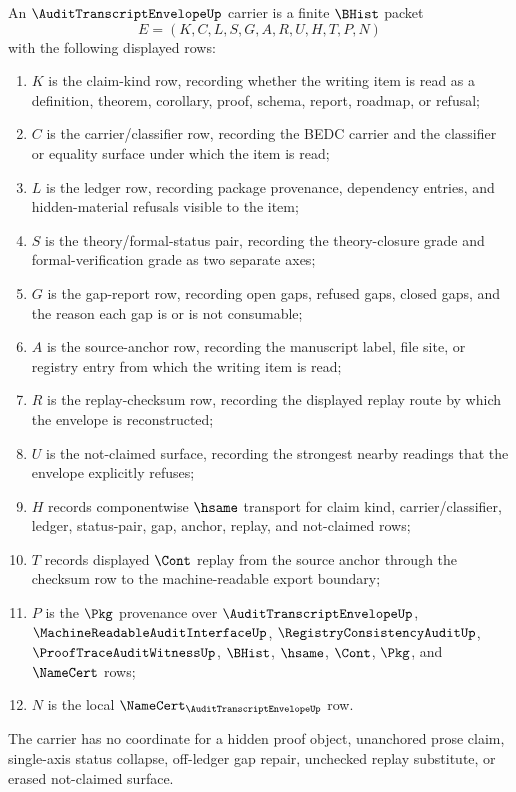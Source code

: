 \begin{definition}
\label{def:audit-transcript-envelope-carrier}
An $\AuditTranscriptEnvelopeUp$ carrier is a finite $\BHist$ packet
$$
E=(K,C,L,S,G,A,R,U,H,T,P,N)
$$
with the following displayed rows:
\begin{enumerate}
\item $K$ is the claim-kind row, recording whether the writing item is read as a definition, theorem, corollary, proof, schema, report, roadmap, or refusal;
\item $C$ is the carrier/classifier row, recording the BEDC carrier and the classifier or equality surface under which the item is read;
\item $L$ is the ledger row, recording package provenance, dependency entries, and hidden-material refusals visible to the item;
\item $S$ is the theory/formal-status pair, recording the theory-closure grade and formal-verification grade as two separate axes;
\item $G$ is the gap-report row, recording open gaps, refused gaps, closed gaps, and the reason each gap is or is not consumable;
\item $A$ is the source-anchor row, recording the manuscript label, file site, or registry entry from which the writing item is read;
\item $R$ is the replay-checksum row, recording the displayed replay route by which the envelope is reconstructed;
\item $U$ is the not-claimed surface, recording the strongest nearby readings that the envelope explicitly refuses;
\item $H$ records componentwise $\hsame$ transport for claim kind, carrier/classifier, ledger, status-pair, gap, anchor, replay, and not-claimed rows;
\item $T$ records displayed $\Cont$ replay from the source anchor through the checksum row to the machine-readable export boundary;
\item $P$ is the $\Pkg$ provenance over $\AuditTranscriptEnvelopeUp$, $\MachineReadableAuditInterfaceUp$, $\RegistryConsistencyAuditUp$, $\ProofTraceAuditWitnessUp$, $\BHist$, $\hsame$, $\Cont$, $\Pkg$, and $\NameCert$ rows;
\item $N$ is the local $\NameCert_{\AuditTranscriptEnvelopeUp}$ row.
\end{enumerate}
The carrier has no coordinate for a hidden proof object, unanchored prose claim, single-axis status collapse, off-ledger gap repair, unchecked replay substitute, or erased not-claimed surface.
\end{definition}


